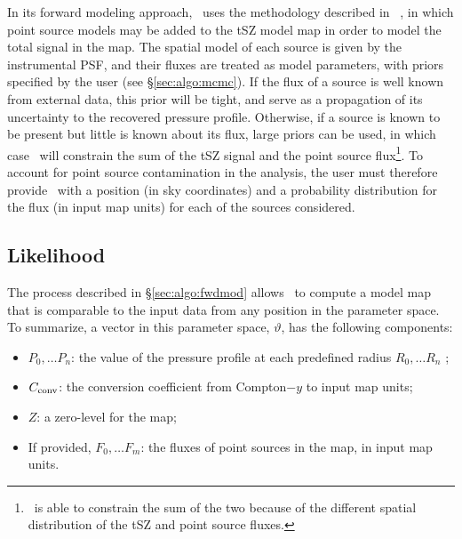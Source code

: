 In its forward modeling approach, \panco\ uses the methodology described in \eg\ \citet{keruzore_exploiting_2020}, in which point source models may be added to the tSZ model map in order to model the total signal in the map.
The spatial model of each source is given by the instrumental PSF, and their fluxes are treated as model parameters, with priors specified by the user (see \S\ref{sec:algo:mcmc}).
If the flux of a source is well known from external data, this prior will be tight, and serve as a propagation of its uncertainty to the recovered pressure profile.
Otherwise, if a source is known to be present but little is known about its flux, large priors can be used, in which case \panco\ will constrain the sum of the tSZ signal and the point source flux\footnote{\panco\ is able to constrain the sum of the two because of the different spatial distribution of the tSZ and point source fluxes.}.
To account for point source contamination in the analysis, the user must therefore provide \panco\ with a position (in sky coordinates) and a probability distribution for the flux (in input map units) for each of the sources considered.

\subsection{Likelihood} \label{sec:algo:likelihood}

The process described in \S\ref{sec:algo:fwdmod} allows \panco\ to compute a model map that is comparable to the input data from any position in the parameter space.
To summarize, a vector in this parameter space, $\vartheta$, has the following components:
\begin{itemize}[leftmargin=*]
    \item $P_0, \dots P_n$: the value of the pressure profile at each predefined radius $R_0, \dots R_n$ ; \\
    \item $C_{\rm conv}$: the conversion coefficient from Compton$-y$ to input map units;
    \item $Z$: a zero-level for the map;
    \item If provided, $F_0, \dots F_m$: the fluxes of point sources in the map, in input map units.
\end{itemize}

